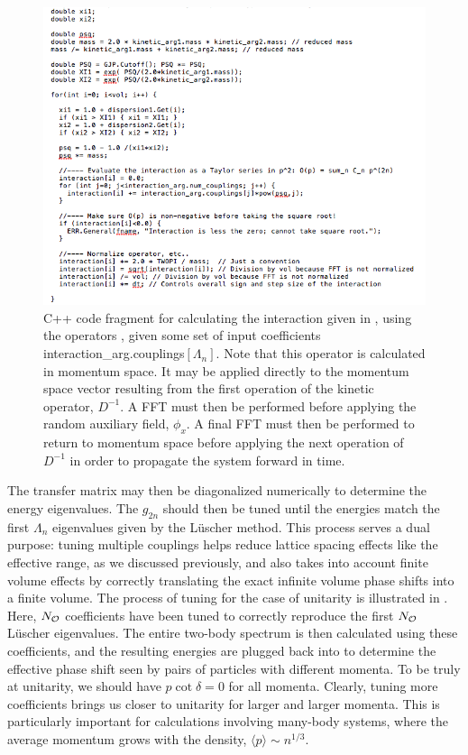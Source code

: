 \begin{figure}
\caption{\label{fig:interaction}C++ code fragment for calculating the interaction given in , using the operators , given some set of input coefficients interaction\_arg.couplings$[\Lambda_n]$. Note that this operator is calculated in momentum space. It may be applied directly to the momentum space vector resulting from the first operation of the kinetic operator, $D^{-1}$. A FFT must then be performed before applying the random auxiliary field, $\phi_x$. A final FFT must then be performed to return to momentum space before applying the next operation of $D^{-1}$ in order to propagate the system forward in time.}
\includegraphics[width=0.9\linewidth]{Chapter5-figures/interaction}
\end{figure}

The transfer matrix may then be diagonalized numerically to determine the energy eigenvalues. The $g_{2n}$ should then be tuned until the energies match the first $\Lambda_n$ eigenvalues given by the L\"uscher method. This process serves a dual purpose: tuning multiple couplings helps reduce lattice spacing effects like the effective range, as we discussed previously, and also takes into account finite volume effects by correctly translating the exact infinite volume phase shifts into a finite volume. The process of tuning for the case of unitarity is illustrated in . Here, $N_{{\mathcal{ O}}}$ coefficients have been tuned to correctly reproduce the first $N_{{\mathcal{ O}}}$ L\"uscher eigenvalues. The entire two-body spectrum is then calculated using these coefficients, and the resulting energies are plugged back into  to determine the effective phase shift seen by pairs of particles with different momenta. To be truly at unitarity, we should have $p\cot\delta = 0$ for all momenta. Clearly, tuning more coefficients brings us closer to unitarity for larger and larger momenta. This is particularly important for calculations involving many-body systems, where the average momentum grows with the density, $\langle p \rangle \sim n^{1/3}$.

